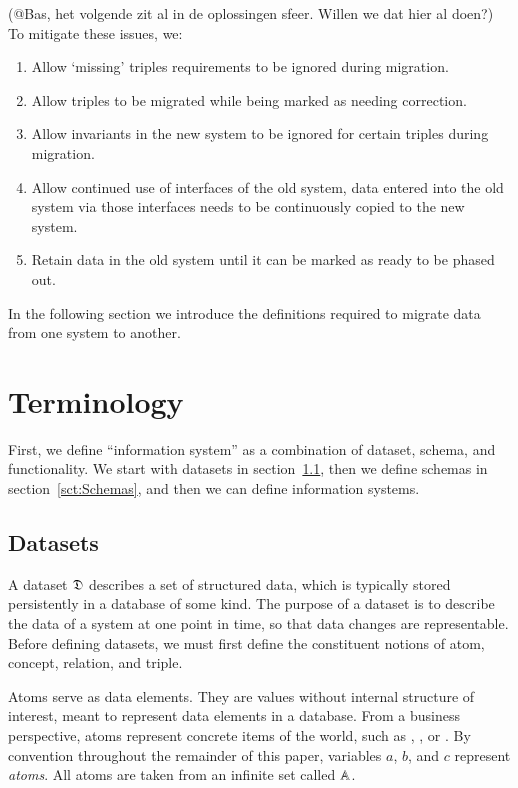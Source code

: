 \documentclass{elsarticle}
\begin{document}
(@Bas, het volgende zit al in de oplossingen sfeer. Willen we dat hier al doen?)
   To mitigate these issues, we:
   
   \begin{enumerate}
   \item Allow `missing' triples requirements to be ignored during migration.
   \item Allow triples to be migrated while being marked as needing correction.
   \item Allow invariants in the new system to be ignored for certain triples during migration.
   \item Allow continued use of interfaces of the old system, data entered into the old system via those interfaces needs to be continuously copied to the new system.
   \item Retain data in the old system until it can be marked as ready to be phased out.
   \end{enumerate}   

   In the following section we introduce the definitions required to migrate data from one system to another.

\section{Terminology}
\label{sct:Terminology}
   First,
   we define ``information system'' as a combination of dataset, schema, and functionality.
   We start with datasets in section~\ref{sct:Datasets}, then we define schemas in section~\ref{sct:Schemas},
   and then we can define information systems.

\subsection{Datasets}
\label{sct:Datasets}
   A dataset $\mathfrak{D}$ describes a set of structured data, which is typically stored persistently in a database of some kind.
   The purpose of a dataset is to describe the data of a system at one point in time, so that data changes are representable. 
   Before defining datasets, we must first define the constituent notions of atom, concept, relation, and triple.
   
   Atoms serve as data elements.
   They are values without internal structure of interest, meant to represent data elements in a database.
   From a business perspective, atoms represent concrete items of the world,
   such as , , or .
   By convention throughout the remainder of this paper, variables $a$, $b$, and $c$ represent \emph{atoms}.
   All atoms are taken from an infinite set called $\mathbb{A}$.
   
\end{document}
